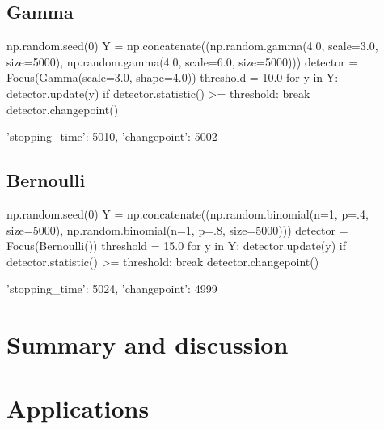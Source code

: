\documentclass[article]{jss}
\begin{document}
\subsection{Gamma}
%
\begin{CodeChunk}
\begin{CodeInput}
np.random.seed(0)
Y = np.concatenate((np.random.gamma(4.0, scale=3.0, size=5000),
                    np.random.gamma(4.0, scale=6.0, size=5000)))
detector = Focus(Gamma(scale=3.0, shape=4.0))
threshold = 10.0
for y in Y:
    detector.update(y)
    if detector.statistic() >= threshold:
        break
detector.changepoint()
\end{CodeInput}
\begin{CodeOutput}
{'stopping_time': 5010, 'changepoint': 5002}
\end{CodeOutput}
\end{CodeChunk}
%
%
\subsection{Bernoulli}
%
\begin{CodeChunk}
\begin{CodeInput}
np.random.seed(0)
Y = np.concatenate((np.random.binomial(n=1, p=.4, size=5000),
                    np.random.binomial(n=1, p=.8, size=5000)))
detector = Focus(Bernoulli())
threshold = 15.0
for y in Y:
    detector.update(y)
    if detector.statistic() >= threshold:
        break
detector.changepoint()
\end{CodeInput}
\begin{CodeOutput}
{'stopping_time': 5024, 'changepoint': 4999}
\end{CodeOutput}
\end{CodeChunk}






\section{Summary and discussion} \label{section:summary}





\section{Applications} \label{section:applications}
\end{document}
